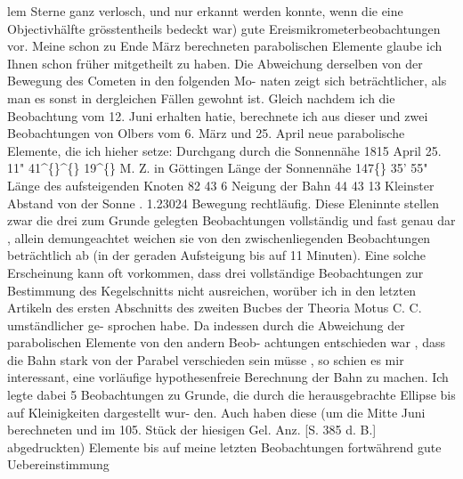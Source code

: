 \documentclass[12pt,a4paper]{article}
\newcommand{\degree}{\textdegree}
\begin{document}
lem Sterne  ganz  verlosch,  und  nur  erkannt  werden  konnte,  wenn  die  eine  Objectivhälfte  grösstentheils 
bedeckt  war)  gute  Ereismikrometerbeobachtungen  vor. 
Meine  schon  zu  Ende  März  berechneten  parabolischen  Elemente  glaube  ich  Ihnen  schon  früher 
mitgetheilt  zu  haben.  Die  Abweichung  derselben  von  der  Bewegung  des  Cometen  in  den  folgenden  Mo- 
naten zeigt  sich  beträchtlicher,  als  man  es  sonst  in  dergleichen  Fällen  gewohnt  ist.  Gleich  nachdem 
ich  die  Beobachtung  vom  12.  Juni  erhalten  hatie,  berechnete  ich  aus  dieser  und  zwei  Beobachtungen 
von  Olbers  vom  6.  März  und  25.  April  neue  parabolische  Elemente,  die  ich  hieher  setze: 
Durchgang  durch  die  Sonnennähe  1815  April  25.  11"  41\textasciicircum\{\}\textasciicircum\{\}  19\textasciicircum\{\}  M.  Z.  in  Göttingen 
Länge  der  Sonnennähe   
147\degree\{\}   35'   55" 
Länge  des  aufsteigenden  Knoten   
82    43      6 
Neigung  der  Bahn   
44    43     13 
Kleinster  Abstand  von  der  Sonne   .   
1.23024 
Bewegung  rechtläufig. 
Diese  Eleninnte  stellen  zwar  die  drei  zum  Grunde  gelegten  Beobachtungen  vollständig  und  fast  genau 
dar ,  allein  demungeachtet  weichen  sie  von  den  zwischenliegenden  Beobachtungen  beträchtlich  ab  (in 
der  geraden  Aufsteigung  bis  auf  11  Minuten).  Eine  solche  Erscheinung  kann  oft  vorkommen,  dass  drei 
vollständige  Beobachtungen  zur  Bestimmung  des  Kegelschnitts  nicht  ausreichen,  worüber  ich  in  den 
letzten  Artikeln  des  ersten  Abschnitts  des  zweiten  Bucbes  der  Theoria  Motus  C.  C.  umständlicher  ge- 
sprochen habe.  Da  indessen  durch  die  Abweichung  der  parabolischen  Elemente  von  den  andern  Beob- 
achtungen entschieden  war ,  dass  die  Bahn  stark  von  der  Parabel  verschieden  sein  müsse ,  so  schien  es 
mir  interessant,  eine  vorläufige  hypothesenfreie  Berechnung  der  Bahn  zu  machen.  Ich  legte  dabei  5 
Beobachtungen  zu  Grunde,  die  durch  die  herausgebrachte  Ellipse  bis  auf  Kleinigkeiten  dargestellt  wur- 
den. Auch  haben  diese  (um  die  Mitte  Juni  berechneten  und  im  105.  Stück  der  hiesigen  Gel.  Anz.  [S.  385 
d.  B.]  abgedruckten)  Elemente  bis  auf  meine  letzten  Beobachtungen  fortwährend  gute  Uebereinstimmung 
\end{document}
